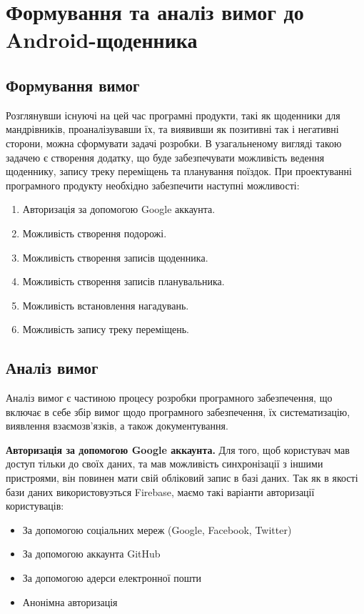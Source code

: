 \documentclass[../main.tex]{subfiles}
\begin{document}
\chapter{Формування та аналіз вимог до Android-щоденника}

\section{Формування вимог}

Розглянувши існуючі на цей час програмні продукти, такі як щоденники для мандрівників, проаналізувавши їх, та виявивши як позитивні так і негативні сторони, можна сформувати задачі розробки. В узагальненому вигляді такою задачею є створення додатку, що буде забезпечувати можливість ведення щоденнику, запису треку переміщень та планування поїздок.
При проектуванні програмного продукту необхідно забезпечити наступні можливості:

\begin{enumerate}
	\item Авторизація за допомогою Google аккаунта.
	\item Можливість створення подорожі.
	\item Можливість створення записів щоденника.
	\item Можливість створення записів планувальника.
	\item Можливість встановлення нагадувань.
	\item Можливість запису треку переміщень.
\end{enumerate}

\section{Аналіз вимог}

Аналіз вимог є частиною процесу розробки програмного забезпечення, що включає в себе збір вимог щодо програмного забезпечення, їх систематизацію, виявлення взаємозв'язків, а також документування.

{\bfseries{Авторизація за допомогою Google аккаунта.}}
Для того, щоб користувач мав доступ тільки до своїх даних, та мав можливість синхронізації з іншими пристроями, він повинен мати свій обліковий запис в базі даних. Так як в якості бази даних використовуэться Firebase, маємо такі варіанти авторизації користуваців: 
\begin{itemize}
	\item За допомогою соціальних мереж (Google, Facebook, Twitter)
	\item За допомогою аккаунта GitHub
	\item За допомогою адерси електронної пошти
	\item Анонімна авторизація
\end{itemize}
\end{document}
